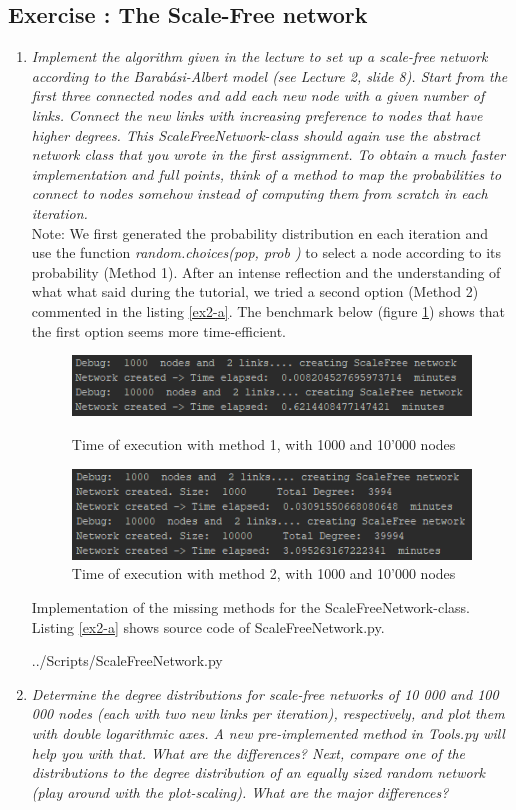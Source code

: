 \documentclass[10pt,a4paper]{article}
\newcommand{\exercise}[1]
{
  \stepcounter{subsection}
  \subsection*{Exercise \thesubsection: #1}

}
\begin{document}
\exercise{The Scale-Free network}
\begin{enumerate}
\item \textit{Implement the algorithm given in the lecture to set up a scale-free network according to the
	Barabási-Albert model (see Lecture 2, slide 8). Start from the first three connected nodes
	and add each new node with a given number of links. Connect the new links with increasing
	preference to nodes that have higher degrees. This ScaleFreeNetwork-class should again
	use the abstract network class that you wrote in the first assignment.
	To obtain a much faster implementation and full points, think of a method to map the
	probabilities to connect to nodes somehow instead of computing them from scratch in each
	iteration.}\\

Note: We first generated the probability distribution en each iteration and use the function \textit{random.choices(pop, prob
	)} to select a node according to its probability (Method 1). After an intense reflection and the understanding of what what said during the tutorial, we tried a second option (Method 2) commented in the listing \ref{ex2-a}. The benchmark below (figure \ref{fig:timemethod1}) shows that the first option seems more time-efficient. 


\begin{figure}[H]
	\centering
	\includegraphics[width=0.7\linewidth]{img/time_method1}
	\caption{Time of execution with method 1, with 1000 and 10'000 nodes}
	\includegraphics[width=0.7\linewidth]{img/time_method2}
	\caption{Time of execution with method 2, with 1000 and 10'000 nodes}
	\label{fig:timemethod1}
\end{figure}


Implementation of the missing methods for the ScaleFreeNetwork-class. Listing \ref{ex2-a} shows source code of ScaleFreeNetwork.py.

\newpage
 {../Scripts/ScaleFreeNetwork.py}

\item \textit{Determine the degree distributions for scale-free networks of 10 000 and 100 000 nodes
	(each with two new links per iteration), respectively, and plot them with double logarithmic
	axes. A new pre-implemented method in Tools.py will help you with that. What are the
	differences?
	Next, compare one of the distributions to the degree distribution of an equally sized random
	network (play around with the plot-scaling). What are the major differences?
}\\




\end{enumerate}
\end{document}
